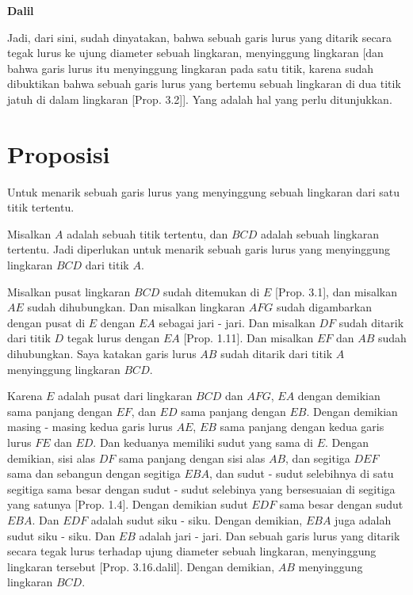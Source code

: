 \documentclass[a4paper]{book}
\begin{document}
\begin{center}\textbf{Dalil}\end{center}
Jadi, dari sini, sudah dinyatakan, bahwa sebuah garis lurus yang ditarik secara
tegak lurus ke ujung diameter sebuah lingkaran, menyinggung 
lingkaran [dan bahwa garis lurus itu menyinggung lingkaran pada satu titik, 
karena sudah dibuktikan bahwa sebuah garis lurus yang bertemu sebuah lingkaran 
di dua titik jatuh di dalam lingkaran [Prop. 3.2]]. Yang adalah hal yang perlu 
ditunjukkan.

\section*{\centering Proposisi \thesection}
Untuk menarik sebuah garis lurus yang menyinggung sebuah lingkaran dari satu
titik tertentu.
\begin{center}
\end{center}
Misalkan $A$ adalah sebuah titik tertentu, dan $BCD$ adalah sebuah lingkaran 
tertentu. Jadi diperlukan untuk menarik sebuah garis lurus yang menyinggung 
lingkaran $BCD$ dari titik $A$.

Misalkan pusat lingkaran $BCD$ sudah ditemukan di $E$ [Prop. 3.1], dan misalkan
$AE$ sudah dihubungkan. Dan misalkan lingkaran $AFG$ sudah digambarkan dengan 
pusat di $E$ dengan $EA$ sebagai jari - jari. Dan misalkan $DF$ sudah ditarik
dari titik $D$ tegak lurus dengan $EA$ [Prop. 1.11]. Dan misalkan $EF$ dan
$AB$ sudah dihubungkan. Saya katakan garis lurus $AB$ sudah ditarik dari titik
$A$ menyinggung lingkaran $BCD$.

Karena $E$ adalah pusat dari lingkaran $BCD$ dan $AFG$, $EA$ dengan demikian 
sama panjang dengan $EF$, dan $ED$ sama panjang dengan $EB$. Dengan demikian
masing - masing kedua garis lurus $AE$, $EB$ sama panjang dengan kedua garis
lurus $FE$ dan $ED$. Dan keduanya memiliki sudut yang sama di $E$. Dengan 
demikian, sisi alas $DF$ sama panjang dengan sisi alas $AB$, dan segitiga $DEF$
sama dan sebangun dengan segitiga $EBA$, dan sudut - sudut selebihnya di satu
segitiga sama besar dengan sudut - sudut selebinya yang bersesuaian di segitiga 
yang satunya [Prop. 1.4]. Dengan demikian sudut $EDF$ sama besar dengan sudut 
$EBA$. Dan $EDF$ adalah sudut siku - siku. Dengan demikian, $EBA$ juga adalah
sudut siku - siku. Dan $EB$ adalah jari - jari. Dan sebuah garis lurus
yang ditarik secara tegak lurus terhadap ujung diameter sebuah lingkaran, 
menyinggung lingkaran tersebut [Prop. 3.16.dalil]. Dengan demikian, $AB$ 
menyinggung lingkaran $BCD$.
\end{document}
